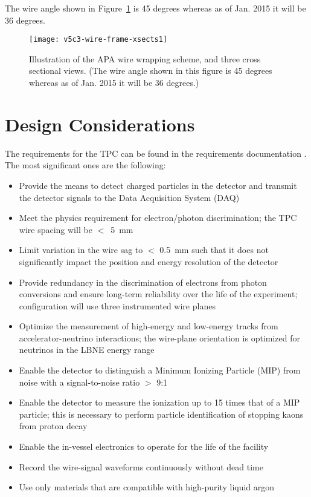 \begin{editornote}
The wire angle shown in Figure~\ref{fig:tpc-wire-frame-xsect} is 45 degrees whereas as of Jan. 2015 it will be 36 degrees. \end{editornote}


\begin{figure}[htpb]
\centering
\texttt{[image: v5c3-wire-frame-xsects1]}
\caption[Illustration of the APA wire wrapping scheme]{Illustration of the APA wire wrapping scheme, and three cross sectional views. (The wire angle shown in this figure is 45 degrees whereas as of Jan. 2015 it will be 36 degrees.)} 
\label{fig:tpc-wire-frame-xsect}
\end{figure}

\section{Design Considerations} 
\label{sec:v5-tpc-reqs-n-specs}

The requirements for the TPC can be found in the requirements documentation \cite{lar-fd-req}. The most significant ones are the following:

\begin{itemize}	
\item Provide the means to detect charged particles in the detector and transmit the detector signals to the Data Acquisition System (DAQ)
\item Meet the physics requirement for electron/photon discrimination;  the TPC wire spacing will be $<$~5~mm
\item Limit variation in the wire sag to $<$ 0.5~mm such that it does not significantly impact the position and energy resolution of the detector
\item Provide redundancy in the discrimination of electrons from photon conversions and ensure long-term reliability over the life of the experiment;  configuration will use three instrumented wire planes
\item Optimize the measurement of high-energy and low-energy tracks from accelerator-neutrino interactions; the wire-plane orientation is optimized for neutrinos in the LBNE energy range
\item Enable the detector to distinguish a Minimum Ionizing Particle (MIP) from noise with a signal-to-noise ratio $>$ 9:1
\item Enable the detector to measure the ionization up to 15 times that of a MIP particle; this is necessary to perform particle identification of stopping kaons from proton decay
\item Enable the in-vessel electronics to operate for the life of the facility
\item Record the wire-signal waveforms continuously without dead time
\item Use only materials that are compatible with high-purity liquid argon

\end{itemize}

